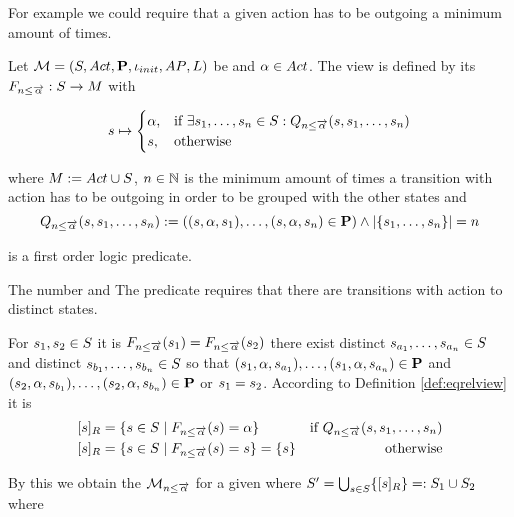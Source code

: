 \documentclass[preview]{standalone}
\begin{document}
For example we could require that a given action has to be outgoing a minimum amount of times. 

\begin{definition}
	Let ${{{\mathcal{M}}}} = {{({S}, {Act}, {\textbf{P}}, {\iota_{init}}, {AP}, {L})}}$ be \chosengraphtypeN and ${\alpha} \in {Act}$. The view \viewminoutaction is defined by its \grpfctN ${{F_{{n}\leq{\overrightarrow{\ensuremath{{\alpha}}}}}}} : {S} \to {M}$ with
	
	\[
	{s} \mapsto
	\begin{cases}
		{\alpha},				& \text{if } \exists {s}_1, \dots, {s}_{n} \in {S}:  {Q_{{n}\leq{\overrightarrow{\ensuremath{{\alpha}}}}}({s},{s}_1, \dots, {s}_{{n}})}\\
		{{s}},          	& \text{otherwise}
	\end{cases}
	\]
	
	where ${{M}} := {{Act} \cup {S}}$, ${n} \in {\mathbb{N}}$ is the minimum amount of times a transition with action \action has to be outgoing in order to be grouped with the other states and
	\[
	{Q_{{n}\leq{\overrightarrow{\ensuremath{{\alpha}}}}}({s},{s}_1, \dots, {s}_{{n}})} := (({s}, {\alpha}, {s}_1), \dots, ({s}, {\alpha}, {s}_{n}) \in {\ensuremath{{\textbf{P}}}}) \land |\{{s}_1, \dots, {s}_{n}\}| = {n}
	\]
	
	is a first order logic predicate.
	\label{def:minoutaction}
\end{definition}

The number  and  
The predicate \predminoutact requires that there are transitions with action \action to \numoutact distinct states.

For ${s}_1,{s}_2 \in {S}$ it is ${{F_{{n}\leq{\overrightarrow{\ensuremath{{\alpha}}}}}}}({s}_1) = {{F_{{n}\leq{\overrightarrow{\ensuremath{{\alpha}}}}}}}({s}_2)$ \iffN there exist distinct ${s}_{a_1}, \dots, {s}_{a_{n}} \in {S}$ and distinct ${s}_{b_1}, \dots, {s}_{b_{n}} \in {S}$ so that $({s}_1, {\alpha}, {s}_{a_1}), \dots, ({s}_1, {\alpha}, {s}_{a_{n}}) \in {\ensuremath{{\textbf{P}}}}$ and $({s}_2, {\alpha}, {s}_{b_1}), \dots, ({s}_2, {\alpha}, {s}_{b_{n}}) \in {\ensuremath{{\textbf{P}}}}$ or ${s}_1 = {s}_2$. According to Definition \ref{def:eqrelview} it is 
\begin{align*}
	\eqclassv{\state} &= \{\state \in \states \mid \gfctminoutaction(\state) = \action\} &\text{if } \predminoutact \\ 
	\eqclassv{\state} &= \{\state \in \states \mid \gfctminoutaction(\state) = \state\} = \{\state\} &\text{ otherwise}
\end{align*}

By this we obtain the \viewN ${{{{{\mathcal{M}}}}_{{n}\leq{\overrightarrow{\ensuremath{{\alpha}}}}}}}$ for a given \chosengraphtypeN \chgph where ${S}' = \bigcup_{{s} \in {S}} \{{{[{s}]_{{R}}}}\} =: {S}_1 \cup {S}_2$ where 
\end{document}
